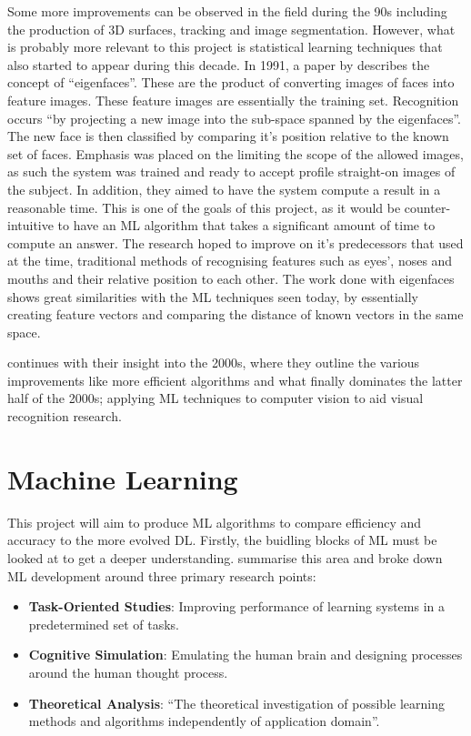\documentclass[12pt,a4paper]{report}
\begin{document}
Some more improvements can be observed in the field during the 90s including the production of 3D surfaces, tracking 
and image 
segmentation. However, what is probably more relevant to this project is statistical learning techniques that also 
started to appear during this decade. In 1991, a paper by \citet{turk1991face} describes
the concept of “eigenfaces”. These are the product of converting images of faces into feature images. These feature 
images are essentially the training set. Recognition occurs “by projecting a new image into the sub-space spanned by 
the eigenfaces”. The new face is then classified by comparing it's position relative to the known set of faces. 
Emphasis was placed on the limiting the scope of the allowed images, as such the system was trained and ready to 
accept profile straight-on images of the subject. In addition, they aimed to have the system compute a result
in a reasonable time. This is one of the goals of this project, as it would be counter-intuitive to have an ML algorithm 
that takes a significant amount of time to compute an answer.
The research hoped to improve on it's 
predecessors that used at the time, traditional methods of recognising features such as eyes', noses and mouths and 
their relative position to each other. The work done with eigenfaces shows great similarities with the ML
techniques seen today, by essentially creating feature vectors and comparing the distance of known 
vectors in the same space.

\par

\citet{SzeliskiRichard2011CV:A} continues with their insight into the 2000s, where they outline the various 
improvements like more efficient algorithms and what finally dominates the latter half of the 2000s; applying ML 
techniques to computer vision to aid visual recognition research.

\section{Machine Learning}

This project will aim to produce ML algorithms to compare efficiency and accuracy to the more evolved DL. 
Firstly, the buidling blocks of ML must be looked at to get a deeper understanding. 
\citet{CamastraFrancescoMLfA} summarise this area and broke down ML development around three primary research 
points:

\begin{itemize}
    \item \textbf{Task-Oriented Studies}: Improving performance of learning systems in a predetermined set of tasks.
    \item \textbf{Cognitive Simulation}: Emulating the human brain and designing processes around the human thought process.
    \item \textbf{Theoretical Analysis}: “The theoretical investigation of possible learning methods and algorithms 
    independently of application domain”.
\end{itemize}
\end{document}
